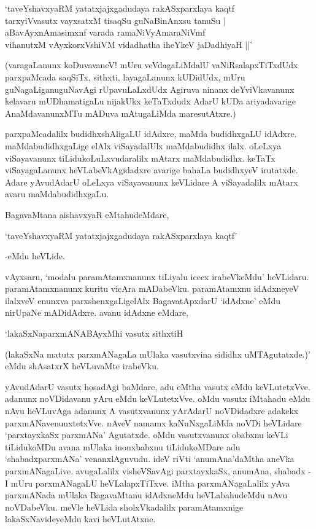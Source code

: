 \begin{shloka}
`taveYshavxyaRM yatatxjajxgadudaya rakASxparxlaya kaqtf\\
tarxyiVvasutx vayxsatxM tisaqSu guNaBinAnxsu tanuSu |\\
aBavAyxnAmasimxnf varada ramaNiVyAmaraNiVmf\\
vihanutxM vAyxkorxVshiVM vidadhatha iheYkeV jaDadhiyaH ||'
\end{shloka}

(varagaLanunx koDuvavaneV! mUru veVdagaLiMdalU vaNiRsalapxTiTxdUdx parxpaMcada saqSiTx, sithxti, layagaLanunx kUDidUdx, mUru guNagaLiganuguNavAgi rUpavuLaLxdUdx Agiruva ninanx deYviVkavanunx kelavaru mUDhamatigaLu nijakUkx keTaTxdudx AdarU kUDa ariyadavarige AnaMdavanunxMTu mADuva mAtugaLiMda maresutAtxre.)

parxpaMcadalilx budidhxshAligaLU idAdxre, maMda budidhxgaLU idAdxre. maMdabudidhxgaLige elAlx viSayadalUlx maMdabudidhx ilalx. oLeLxya viSayavanunx tiLidukoLuLxvudaralilx mAtarx maMdabudidhx. keTaTx viSayagaLanunx heVLabeVkAgidadxre avarige bahaLa budidhxyeV irutatxde. Adare yAvudAdarU oLeLxya viSayavanunx keVLidare A viSayadalilx mAtarx avaru maMdabudidhxgaLu.

BagavaMtana aishavxyaR eMtahudeMdare,

\begin{shloka}
`taveYshavxyaRM yatatxjajxgadudaya rakASxparxlaya kaqtf'
\end{shloka}

-eMdu heVLide.

vAyxsaru, `modalu paramAtamxnanunx tiLiyalu icecx irabeVkeMdu' heVLidaru. paramAtamxnanunx kuritu vicAra mADabeVku. paramAtamxnu idAdxneyeV ilalxveV enunxva parxshenxgaLigelAlx BagavatApxdarU `idAdxne' eMdu nirUpaNe mADidAdxre. avanu idAdxne eMdare,

\begin{shloka}
`lakaSxNaparxmANABAyxMhi vasutx sithxtiH
\end{shloka}

(lakaSxNa matutx parxmANagaLa mUlaka vasutxvina sididhx uMTAgutatxde.)' eMdu shAsatxrX heVLuvaMte irabeVku.

yAvudAdarU vasutx hosadAgi baMdare, adu eMtha vasutx eMdu keVLutetxVve. adanunx noVDidavanu yAru eMdu keVLutetxVve. oMdu vasutx iMtahadu eMdu nAvu heVLuvAga adanunx A vasutxvanunx yArAdarU noVDidadxre adakekx parxmANavenunxtetxVve. nAveV namamx kaNuNxgaLiMda noVDi heVLidare `parxtayxkaSx parxmANa' Agutatxde. oMdu vasutxvanunx obabxnu keVLi tiLidukoMDu avana mUlaka inonxbabxnu tiLidukoMDare adu `shabadxparxmANa' venanxlAguvudu. ideV riVti `anumAna'daMtha aneVka parxmANagaLive. avugaLalilx visheVSavAgi parxtayxkaSx, anumAna, shabadx - I mUru parxmANagaLU heVLalapxTiTxve. iMtha parxmANagaLalilx yAva parxmANada mUlaka BagavaMtanu idAdxneMdu heVLabahudeMdu nAvu noVDabeVku. meVle heVLida sholxVkadalilx paramAtamxnige lakaSxNavideyeMdu kavi heVLutAtxne.


